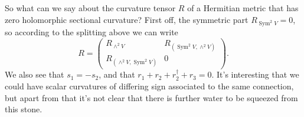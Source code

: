 \documentclass[10pt,a4paper]{amsart}
\theoremstyle{definition}
\DeclareMathOperator{\Sym}{Sym}
\begin{document}
So what can we say about the curvature tensor $R$ of a Hermitian metric that has
zero holomorphic sectional curvature?
First off, the symmetric part $R_{\Sym^2 V} = 0$, so according to the splitting
above we can write
$$
R = \begin{pmatrix}
R_{\wedge^2 V} & R_{(\Sym^2V, \wedge^2 V)}
\\
R_{(\wedge^2 V, \Sym^2V)} & 0
\end{pmatrix}.
$$
We also see that $s_1 = -s_2$, and that $r_1 + r_2 + r_2^\dagger + r_3 = 0$.
It's interesting that we could have scalar curvatures of differing sign
associated to the same connection, but apart from that
it's not clear that there is further water to be squeezed from this stone.




\end{document}
